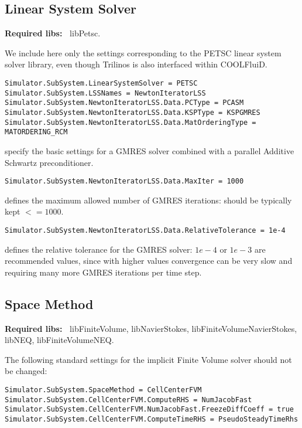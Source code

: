 \documentclass[11pt]{article}
\begin{document}
\subsection{Linear System Solver}

{\bf Required libs:~} libPetsc.

We include here only the settings corresponding to the PETSC linear system solver library,
even though Trilinos is also interfaced within COOLFluiD.

\begin{verbatim}
Simulator.SubSystem.LinearSystemSolver = PETSC
Simulator.SubSystem.LSSNames = NewtonIteratorLSS
Simulator.SubSystem.NewtonIteratorLSS.Data.PCType = PCASM
Simulator.SubSystem.NewtonIteratorLSS.Data.KSPType = KSPGMRES
Simulator.SubSystem.NewtonIteratorLSS.Data.MatOrderingType = MATORDERING_RCM
\end{verbatim}
specify the basic settings for a GMRES solver combined with a parallel Additive Schwartz preconditioner.

\begin{verbatim}
Simulator.SubSystem.NewtonIteratorLSS.Data.MaxIter = 1000
\end{verbatim}
defines the maximum allowed number of GMRES iterations: should be typically kept $<= 1000$.

\begin{verbatim}
Simulator.SubSystem.NewtonIteratorLSS.Data.RelativeTolerance = 1e-4
\end{verbatim}
defines the relative tolerance for the GMRES solver: $1e-4$ or $1e-3$ are recommended values, since with higher values 
convergence can be very slow and requiring many more GMRES iterations per time step.

\subsection{Space Method}

{\bf Required libs:~} libFiniteVolume, libNavierStokes, libFiniteVolumeNavierStokes, libNEQ,  libFiniteVolumeNEQ. 

The following standard settings for the implicit Finite Volume solver should not be changed:

\begin{verbatim}
Simulator.SubSystem.SpaceMethod = CellCenterFVM
Simulator.SubSystem.CellCenterFVM.ComputeRHS = NumJacobFast
Simulator.SubSystem.CellCenterFVM.NumJacobFast.FreezeDiffCoeff = true
Simulator.SubSystem.CellCenterFVM.ComputeTimeRHS = PseudoSteadyTimeRhs
\end{verbatim}
\end{document}
